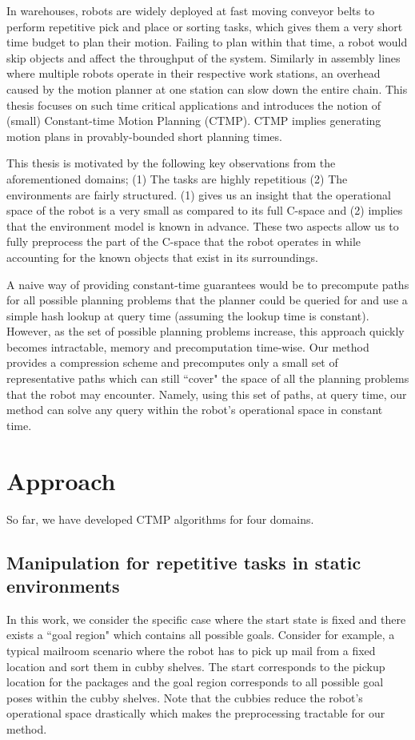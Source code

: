 \documentclass[a4paper]{report}
\begin{document}
In warehouses, robots are widely deployed at fast moving conveyor belts to perform repetitive pick and place or sorting tasks, which gives them a very short time budget to plan their motion. Failing to plan within that time, a robot would skip objects and affect the throughput of the system. Similarly in assembly lines where multiple robots operate in their respective work stations, an overhead caused by the motion planner at one station can slow down the entire chain. This thesis focuses on such time critical applications and introduces the notion of (small) Constant-time Motion Planning (CTMP). CTMP implies generating motion plans in provably-bounded short planning times.

This thesis is motivated by the following key observations from the aforementioned domains; (1) The tasks are highly repetitious (2) The  environments are fairly structured. (1) gives us an insight that the operational space of the robot is a very small as compared to its full C-space and (2) implies that the environment model is known in advance. These two aspects allow us to fully preprocess the part of the C-space that the robot operates in while accounting for the known objects that exist in its surroundings.

A naive way of providing constant-time guarantees would be to precompute paths for all possible planning problems that the planner could be queried for and use a simple hash lookup at query time (assuming the lookup time is constant). However, as the set of possible planning problems increase, this approach quickly becomes intractable, memory and precomputation time-wise. Our method provides a compression scheme and precomputes only a small set of representative paths which can still ``cover" the space of all the planning problems that the robot may encounter. Namely, using this set of paths, at query time, our method can solve any query within the robot's operational space in constant time.

\section{Approach}
\label{sec:approach}
So far, we have developed CTMP algorithms for four domains.
\subsection{Manipulation for repetitive tasks in static environments}
In this work, we consider the specific case where the start state is fixed and there exists a ``goal region" which contains all possible goals. Consider for example, a typical mailroom scenario where the robot has to pick up mail from a fixed location and sort them in cubby shelves. The start corresponds to the pickup location for the packages and the goal region corresponds to all possible goal poses within the cubby shelves. Note that the cubbies reduce the robot's operational space drastically which makes the preprocessing tractable for our method.
\end{document}
